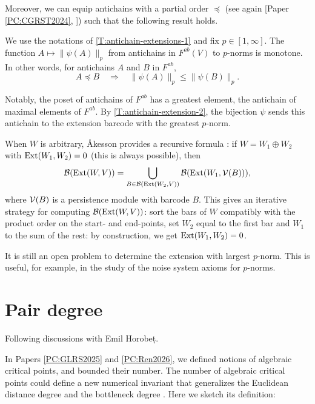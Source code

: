 Moreover, we can equip antichains with a partial order $\preceq$ (see again [Paper \ref{PC:CGRST2024}, ]) such that the following result holds.

\begin{theorem}
\label{T:antichain-extension-2}
  We use the notations of \cref{T:antichain-extensions-1} and fix $p \in [1, \infty]$. The function $A \mapsto \| \psi(A) \|_p$ from antichains in $F^{ab}(V)$ to $p$-norms is monotone. In other words, for antichains $A$ and $B$ in $F^{ab}$,
  \[
    A \preceq B \quad \Rightarrow \quad \| \psi(A) \|_p \leq \| \psi(B) \|_p.
  \]
\end{theorem}

Notably, the poset of antichains of $F^{ab}$ has a greatest element, the antichain of maximal elements of $F^{ab}$. By \cref{T:antichain-extension-2}, the bijection $\psi$ sends this antichain to the extension barcode with the greatest $p$-norm.

When $W$ is arbitrary, Åkesson provides a recursive formula \cite[Theorem 4.1]{Åkesson2023}: if $W = W_1 \oplus W_2$ with $\operatorname{Ext}(W_1, W_2) = 0$ (this is always possible), then
\begin{equation}
\label{Eq:recursive-extension}
  \mathcal{B}(\operatorname{Ext}(W, V)) = \bigcup_{B \in \mathcal{B}(\operatorname{Ext}(W_2, V))} \mathcal{B}(\operatorname{Ext}(W_1, \mathcal{V}(B))),
\end{equation}
where $\mathcal{V}(B)$ is a persistence module with barcode $B$. This gives an iterative strategy for computing $\mathcal{B}(\operatorname{Ext}(W, V))$: sort the bars of $W$ compatibly with the product order on the start- and end-points, set $W_2$ equal to the first bar and $W_1$ to the sum of the rest: by construction, we get $\operatorname{Ext}(W_1, W_2) = 0$.

It is still an open problem to determine the extension with largest $p$-norm. This is useful, for example, in the study of the noise system axioms for $p$-norms.

\section{Pair degree}

Following discussions with Emil Horobeț.

In Papers \ref{PC:GLRS2025} and \ref{PC:Ren2026}, we defined notions of algebraic critical points, and bounded their number. The number of algebraic critical points could define a new numerical invariant that generalizes the Euclidean distance degree \cite{DHOST2016} and the bottleneck degree \cite{DREW2020}. Here we sketch its definition:

